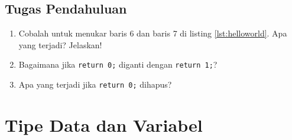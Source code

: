 \begin{itemize}
\end{itemize}
\subsection{Tugas Pendahuluan}
\begin{enumerate}
	\item Cobalah untuk menukar baris 6 dan baris 7 di listing \ref{lst:helloworld}. Apa yang terjadi? Jelaskan!
	\item Bagaimana jika \verb|return 0;| diganti dengan \verb|return 1;|?
	\item Apa yang terjadi jika \verb|return 0;| dihapus?
\end{enumerate}


\section{Tipe Data dan Variabel}
